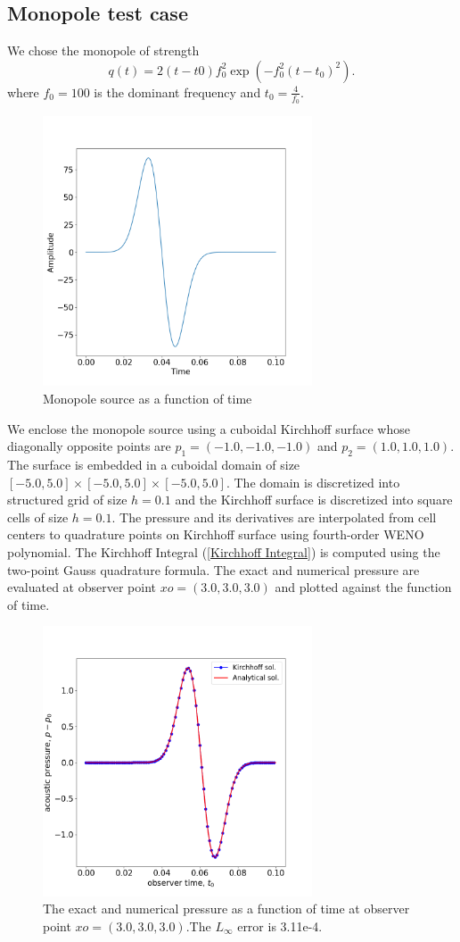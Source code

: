 \documentclass[a4paper]{article}
\begin{document}
\subsection{Monopole test case}
We chose the monopole of strength
\begin{equation}
	q(t) = 2(t - t0)f_{0}^{2}\exp( -f_{0}^2(t - t_{0})^{2}). 
\end{equation}
where $f_{0} = 100$ is the dominant frequency and $t_{0} = \frac{4}{f_{0}}$.
\begin{figure}[h!]\label{Monopole}
	\centering
	\includegraphics[width=80mm]{images/Source.png}
	\caption{Monopole source as a function of time}
\end{figure}
We enclose the monopole source using a cuboidal Kirchhoff surface whose diagonally opposite points are $p_{1} = (-1.0, -1.0, -1.0)$
and $p_{2} = (1.0, 1.0, 1.0)$. The surface is embedded in a cuboidal domain of size $[-5.0,5.0]\times[-5.0,5.0]\times[-5.0,5.0]$. The domain is discretized into structured grid of size $h = 0.1$ and the Kirchhoff surface is discretized into square cells of size $h = 0.1$. The pressure and its derivatives are interpolated from cell centers to quadrature points on Kirchhoff surface using fourth-order WENO polynomial. The Kirchhoff Integral (\ref{Kirchhoff Integral}) is computed using the two-point Gauss quadrature formula. The exact and numerical pressure are evaluated at observer point $xo = (3.0,3.0,3.0)$ and plotted against the function of time.
\begin{figure}[h!]\label{Result}
	\centering
	\includegraphics[width=80mm]{images/Pressure.png}
	\caption{The exact and numerical pressure as a function of time at observer point $xo = (3.0,3.0,3.0)$.The $L_{\infty}$ error is 3.11e-4.} 
\end{figure}

\printbibliography
\end{document}
